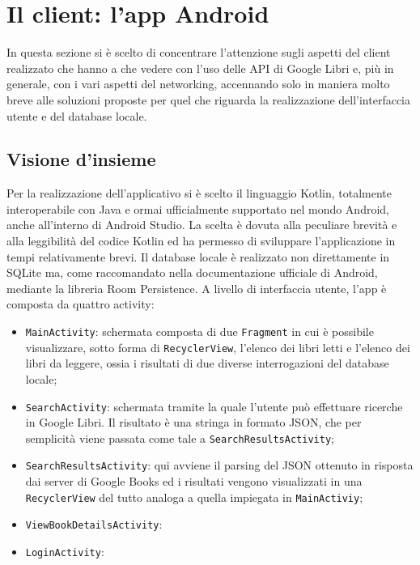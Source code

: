 \documentclass[a4paper]{article}
\def\code#1{\texttt{#1}}
\begin{document}
\section{Il client: l'app Android}
In questa sezione si è scelto di concentrare l'attenzione sugli aspetti del client realizzato che hanno a che vedere con l'uso delle API di Google Libri e, più in generale, con i vari aspetti del networking, accennando solo in maniera molto breve alle soluzioni proposte per quel che riguarda la realizzazione dell'interfaccia utente e del database locale.
	\subsection{Visione d'insieme}
	Per la realizzazione dell'applicativo si è scelto il linguaggio Kotlin, totalmente interoperabile con Java e ormai ufficialmente supportato nel mondo Android, anche all'interno di Android Studio. La scelta è dovuta alla peculiare brevità e alla leggibilità del codice Kotlin ed ha permesso di sviluppare l'applicazione in tempi relativamente brevi.\newline
	Il database locale è realizzato non direttamente in SQLite ma, come raccomandato nella documentazione ufficiale di Android, mediante la libreria Room Persistence.
	A livello di interfaccia utente, l'app è composta da quattro activity:
	\begin{itemize}
		\item \code{MainActivity}: schermata composta di due \code{Fragment} in cui è possibile visualizzare, sotto forma di \code{RecyclerView}, l'elenco dei libri letti e l'elenco dei libri da leggere, ossia i risultati di due diverse interrogazioni del database locale;
		\item \code{SearchActivity}: schermata tramite la quale l'utente può effettuare ricerche in Google Libri. Il risultato è una stringa in formato JSON, che per semplicità viene passata come tale a \code{SearchResultsActivity};
		\item \code{SearchResultsActivity}: qui avviene il parsing del JSON ottenuto in risposta dai server di Google Books ed i risultati vengono visualizzati in una \code{RecyclerView} del tutto analoga a quella impiegata in \code{MainActiviy};
		\item \code{ViewBookDetailsActivity}: %
		\item \code{LoginActivity}: %
	\end{itemize}
\end{document}
